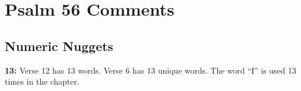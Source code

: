 \section{Psalm 56 Comments}

\subsection{Numeric Nuggets}
\textbf{13:} Verse 12 has 13 words. Verse 6 has 13 unique words. The word ``I'' is used 13 times in the chapter.

